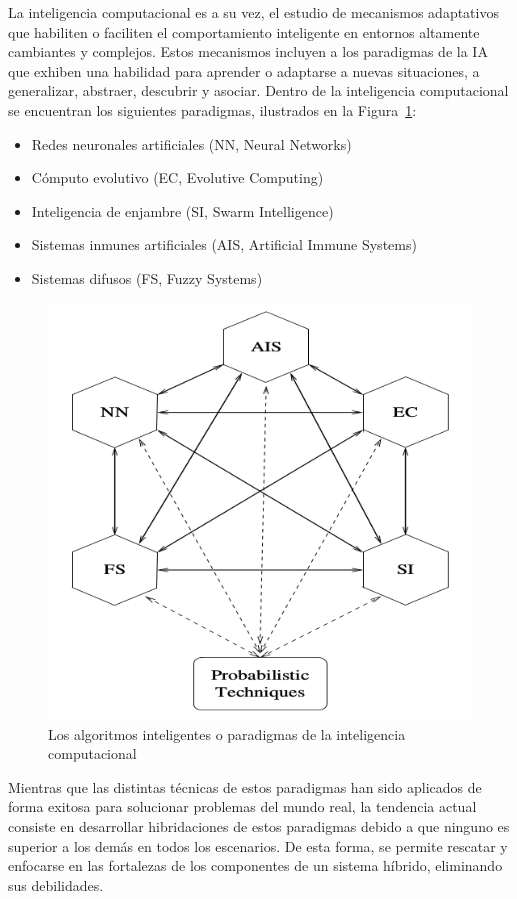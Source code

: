 \documentclass{article}
\begin{document}
La inteligencia computacional es a su vez, el estudio de mecanismos adaptativos que habiliten o faciliten el comportamiento inteligente en entornos altamente cambiantes y complejos.
Estos mecanismos incluyen a los paradigmas de la IA que exhiben una habilidad para aprender o adaptarse a nuevas situaciones, a generalizar, abstraer, descubrir y asociar.
Dentro de la inteligencia computacional se encuentran los siguientes paradigmas, ilustrados en la Figura~\ref{fig:paradigmas-inteligencia-computacional}:
\begin{itemize}
	\item Redes neuronales artificiales (NN, Neural Networks)
	\item Cómputo evolutivo (EC, Evolutive Computing)
	\item Inteligencia de enjambre (SI, Swarm Intelligence)
	\item Sistemas inmunes artificiales (AIS, Artificial Immune Systems)
	\item Sistemas difusos (FS, Fuzzy Systems)
\end{itemize}

\begin{figure}[tb]
	\centering
	\includegraphics[scale=0.25]{../resources/paradigmas-inteligencia-computacional}
	\caption{Los algoritmos inteligentes o paradigmas de la inteligencia computacional}
	\label{fig:paradigmas-inteligencia-computacional}
\end{figure}
Mientras que las distintas técnicas de estos paradigmas han sido aplicados de forma exitosa para solucionar problemas del mundo real, la tendencia actual consiste en desarrollar hibridaciones de estos paradigmas debido a que ninguno es superior a los demás en todos los escenarios.
De esta forma, se permite rescatar y enfocarse en las fortalezas de los componentes de un sistema híbrido, eliminando sus debilidades.
\end{document}
